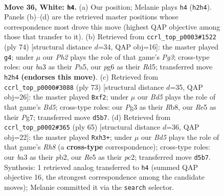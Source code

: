 \documentclass[11pt]{article}
\begin{document}
\clearpage

\begin{figure}[p]\centering
\begin{subfigure}{0.46\textwidth}\centering
\resizebox{\linewidth}{!}{%
\newchessgame
\chessboard[
  setfen={8/pp4kp/6p1/3BR3/8/b5P1/5PKP/1q6 w - - 6 36},
  showmover=false,
  pgfstyle=straightmove, color=movearrow, markmove={h2-h4}
]}
\caption{}
\end{subfigure}\hfill
\begin{subfigure}{0.46\textwidth}\centering
\resizebox{\linewidth}{!}{%
\newchessgame
\chessboard[
  setfen={6k1/5pp1/b1r4p/P2R4/7P/4BPP1/5K2/8 w - - 1 38},
  showmover=false,
  pgfstyle=straightmove, color=movearrow, markmove={g3-g4}
]}
\caption{}
\end{subfigure}
\\[4pt]
\begin{subfigure}{0.46\textwidth}\centering
\resizebox{\linewidth}{!}{%
\newchessgame
\chessboard[
  setfen={1r5k/6p1/5r1p/8/2Bb4/7P/5PPK/4Q3 b - - 6 37},
  showmover=false,
  pgfstyle=straightmove, color=movearrow, markmove={d4-f2}
]}
\caption{}
\end{subfigure}\hfill
\begin{subfigure}{0.46\textwidth}\centering
\resizebox{\linewidth}{!}{%
\newchessgame
\chessboard[
  setfen={8/5pkp/6p1/8/Q5P1/5K1P/1PP2P2/6rr b - - 4 33},
  showmover=false,
  pgfstyle=straightmove, color=movearrow, markmove={h1-h3}
]}
\caption{}
\end{subfigure}
\caption{\textbf{Move 36, White: \texttt{h4}.} (a) Our position; Melanie plays \texttt{h4} (\texttt{h2h4}). Panels (b)--(d) are the retrieved master positions whose correspondence most drove this move (highest QAP objective among those that transfer to it). (b) Retrieved from \texttt{ccrl\_top\_p0003\#1522} (ply 74) [structural distance $d$=34, QAP obj=16]: the master played \texttt{g4}; under $\mu$ our \emph{Ph2} plays the role of that game's \emph{Pg3}; cross-type roles: our \emph{b}a3 as their \emph{P}a5, our \emph{p}g6 as their \emph{R}d5; transferred move \texttt{h2h4} \textbf{(endorses this move)}. (c) Retrieved from \texttt{ccrl\_top\_p0000\#3088} (ply 73) [structural distance $d$=35, QAP obj=26]: the master played \texttt{Bxf2}; under $\mu$ our \emph{Bd5} plays the role of that game's \emph{Bd5}; cross-type roles: our \emph{P}g3 as their \emph{R}b8, our \emph{R}e5 as their \emph{P}g7; transferred move \texttt{d5b7}. (d) Retrieved from \texttt{ccrl\_top\_p0002\#365} (ply 65) [structural distance $d$=36, QAP obj=22]: the master played \texttt{Rxh3+}; under $\mu$ our \emph{Bd5} plays the role of that game's \emph{Rh8} (a \textbf{cross-type} correspondence); cross-type roles: our \emph{b}a3 as their \emph{p}b2, our \emph{R}e5 as their \emph{p}c2; transferred move \texttt{d5b7}. Synthesis: 1 retrieved analog transferred to \texttt{h4} (summed QAP objective 16, the strongest correspondence among the candidate moves); Melanie committed it via the \texttt{search} selector.}
\label{fig:thought-m70}
\end{figure}
\end{document}

